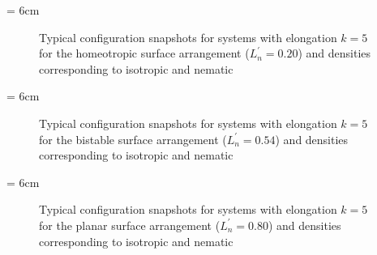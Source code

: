 \picW = 6cm
\begin{figure}[h]
        \centering
	\caption{Typical configuration snapshots for systems with elongation $k=5$ for the homeotropic
	surface arrangement ($L^{'}_n = 0.20$) and densities corresponding to isotropic and nematic}
	\label{fig:typicalSnaps_k5_homeo}
\end{figure}


\picW = 6cm
\begin{figure}[h]
        \centering


	\caption{Typical configuration snapshots for systems with elongation $k=5$ for the bistable
	surface arrangement ($L^{'}_n = 0.54$) and densities corresponding to isotropic and nematic}
	\label{fig:typicalSnaps_k5_bist}
\end{figure}


\picW = 6cm
\begin{figure}[h]
        \centering
	\caption{Typical configuration snapshots for systems with elongation $k=5$ for the planar
	surface arrangement ($L^{'}_n = 0.80$) and densities corresponding to isotropic and nematic}
	\label{fig:typicalSnaps_k5_planar}
\end{figure}




